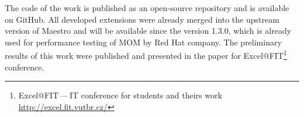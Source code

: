 The code of the work is published as an open-source repository and is available on GitHub. All developed extensions were already merged into the upstream version of Maestro and will be available since the version 1.3.0, which is already used for performance testing of MOM by Red Hat company. The preliminary results of this work were published and presented in the paper for Excel@FIT\footnote{Excel@FIT\,---\,IT conference for students and theirs work \url{http://excel.fit.vutbr.cz/}} conference.



